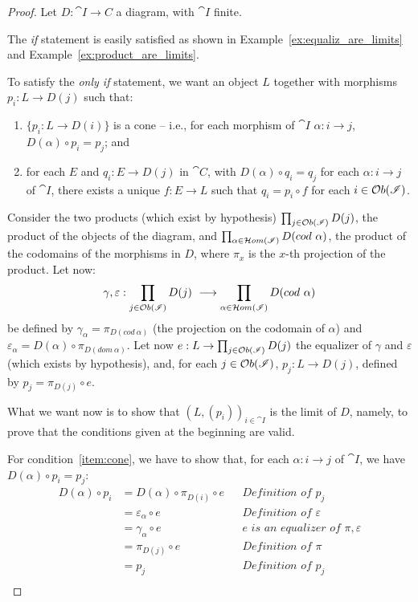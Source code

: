 \documentclass[a4paper, twoside,openright]{report}
\theoremstyle{plain}
\theoremstyle{definition}
\begin{document}
\begin{proof}
    Let $D: \cat{I \rightarrow C}$ a diagram, with $\cat I$ finite.
    
    The \emph{if} statement is easily satisfied as shown in Example~\ref{ex:equaliz_are_limits} and Example~\ref{ex:product_are_limits}.

    To satisfy the \emph{only if} statement, we want an object $L$ together with morphisms $p_i : L \rightarrow D(j)$ such that:
    \begin{enumerate}
        \item\label{item:cone} $\{p_i: L \rightarrow D(i)\}$ is a cone -- i.e., for each morphism of $\cat I$ $\alpha : i \rightarrow j$, $D(\alpha) \circ p_i = p_j$; and
        \item\label{item:univ_prop} for each $E$ and $q_i : E \rightarrow D(j)$ in $\cat C$, with $D(\alpha) \circ q_i = q_j$ for each $\alpha : i \rightarrow j$ of $\cat I$, there exists a unique $f: E \rightarrow L$ such that $q_i = p_i \circ f$ for each $i \in \mathcal{O}b(\mathscr{I})$.
    \end{enumerate}

    Consider the two products (which exist by hypothesis) $\prod_{j \in \mathcal{O}b(\mathscr{I})} D(j)$, the product of the objects of the diagram, and $\prod_{\alpha \in \Hom(\cat I)}D(cod \ \alpha)$, the product of the codomains of the morphisms in $D$, where $\pi_x$ is the $x$-th projection of the product.
    Let now:
    \[
        \gamma, \varepsilon : \prod_{j \in \mathcal{O}b(\mathscr{I})}D(j) \ \longrightarrow \prod_{\alpha \in \mathcal{H}om(\mathscr{I})} D(cod \ \alpha)
    \]
    be defined by $\gamma_\alpha = \pi_{D(cod\ \alpha)}$ (the projection on the codomain of $\alpha$) and $\varepsilon_\alpha = D(\alpha) \circ \pi_{D(dom \ \alpha)}$.
    Let now $e: L \rightarrow \prod_{j \in \mathcal{O}b(\mathscr{I})}D(j)$ the equalizer of $\gamma$ and $\varepsilon$ (which exists by hypothesis), and, for each $j \in \mathcal{O}b(\mathscr{I})$, $p_j: L \rightarrow D(j)$, defined by $p_j = \pi_{D(j)} \circ e$.
    
    What we want now is to show that $(L, (p_i))_{i \in \cat I}$ is the limit of $D$, namely, to prove that the conditions given at the beginning are valid.

    For condition~\ref{item:cone}, we have to show that, for each $\alpha : i \rightarrow j$ of $\cat I$, we have $D(\alpha) \circ p_i = p_j$:
    \begin{align*}
        D(\alpha) \circ p_i 
            &= D(\alpha) \circ \pi_{D(i)} \circ e   && \textit{Definition of $p_j$} \\
            &= \varepsilon_{\alpha} \circ e         && \textit{Definition of $\varepsilon$}\\
            &= \gamma_\alpha \circ e                && \textit{$e$ is an equalizer of $\pi, \varepsilon$}\\
            &= \pi_{D(j)} \circ e                   && \textit{Definition of $\pi$} \\
            &= p_j                                  && \textit{Definition of $p_j$} \\
    \end{align*}


\end{proof}
\end{document}
